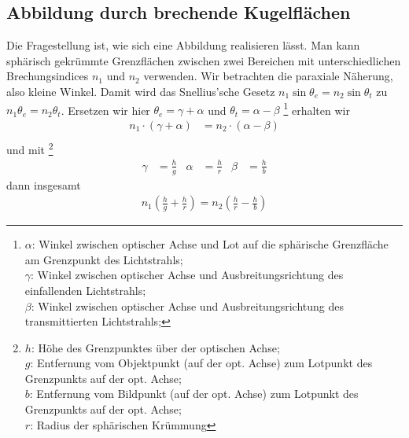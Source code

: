 \subsection{Abbildung durch brechende Kugelflächen}
Die Fragestellung ist, wie sich eine Abbildung realisieren lässt.
Man kann sphärisch gekrümmte Grenzflächen zwischen zwei Bereichen mit
unterschiedlichen Brechungsindices $n_1$ und $n_2$ verwenden.
Wir betrachten die paraxiale Näherung, also kleine Winkel.
Damit wird das Snellius'sche Gesetz $n_1\sin\theta_e =
n_2\sin\theta_t$ zu $n_1\theta_e=n_2\theta_t$.
Ersetzen wir hier $\theta_e=\gamma+\alpha$ und $\theta_t=\alpha-\beta$%
\footnote{$\alpha$: Winkel zwischen optischer Achse und Lot auf die sphärische
Grenzfläche am Grenzpunkt des Lichtstrahls;\\
$\gamma$: Winkel zwischen optischer Achse und Ausbreitungsrichtung des
einfallenden Lichtstrahls;\\
$\beta$: Winkel zwischen optischer Achse und Ausbreitungsrichtung des
transmittierten Lichtstrahls;}
erhalten wir
\begin{align*}
  n_1\cdot(\gamma+\alpha) &= n_2\cdot(\alpha-\beta)\\
\end{align*}
und mit%
\footnote{$h$: Höhe des Grenzpunktes über der optischen Achse;\\
$g$: Entfernung vom Objektpunkt (auf der opt. Achse) zum Lotpunkt des
Grenzpunkts auf der opt. Achse;\\
$b$: Entfernung vom Bildpunkt (auf der opt. Achse) zum Lotpunkt des
Grenzpunkts auf der opt. Achse;\\
$r$: Radius der sphärischen Krümmung}
\begin{align*}
  \gamma &= \frac{h}{g}
  &\alpha &=\frac{h}{r}
  &\beta &= \frac{h}{b}
\end{align*}
dann insgesamt
\begin{gather*}
  n_1\left(\frac{h}{g} + \frac{h}{r}\right)
  = n_2\left(\frac{h}{r} - \frac{h}{b}\right)
\end{gather*}


